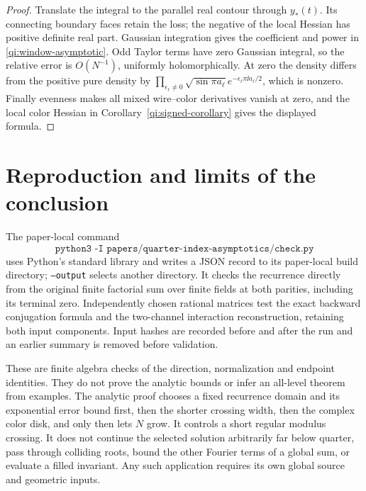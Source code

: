 \begin{proof}
Translate the integral to the parallel real contour through $y_*(t)$. Its connecting boundary faces retain the loss; the negative of the local Hessian has positive definite real part. Gaussian integration gives the coefficient and power in \eqref{qi:window-asymptotic}. Odd Taylor terms have zero Gaussian integral, so the relative error is $O(N^{-1})$, uniformly holomorphically. At zero the density differs from the positive pure density by
$\prod_{\epsilon_\ell\ne0}\sqrt{\sin\pi a_\ell}
 e^{-\epsilon_\ell\pi\ii a_\ell/2}$, which is nonzero.
Finally evenness makes all mixed wire--color derivatives vanish at zero, and the local color Hessian in Corollary~\ref{qi:signed-corollary} gives the displayed formula.
\end{proof}

\section{Reproduction and limits of the conclusion}\label{qi:checks}

The paper-local command
\[
 \texttt{python3 -I papers/quarter-index-asymptotics/check.py}
\]
uses Python's standard library and writes a JSON record to its paper-local build directory; \texttt{--output} selects another directory.
It checks the recurrence directly from the original finite factorial sum over finite fields at both parities, including its terminal zero. Independently chosen rational matrices test the exact backward conjugation formula and the two-channel interaction reconstruction, retaining both input components. Input hashes are recorded before and after the run and an earlier summary is removed before validation.

These are finite algebra checks of the direction, normalization and endpoint identities. They do not prove the analytic bounds or infer an all-level theorem from examples. The analytic proof chooses a fixed recurrence domain and its exponential error bound first, then the shorter crossing width, then the complex color disk, and only then lets $N$ grow. It controls a short regular modulus crossing. It does not continue the selected solution arbitrarily far below quarter, pass through colliding roots, bound the other Fourier terms of a global sum, or evaluate a filled invariant. Any such application requires its own global source and geometric inputs.
